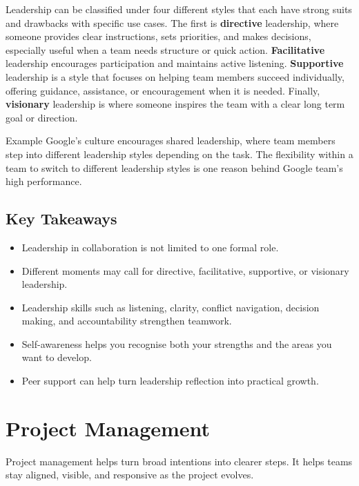 \documentclass{report}
\begin{document}
		Leadership can be classified under four different styles that each have strong suits and drawbacks with specific use cases. The first is \textbf{directive} leadership, where someone provides clear instructions, sets priorities, and makes decisions, especially useful when a team needs structure or quick action. \textbf{Facilitative} leadership encourages participation and maintains active listening. \textbf{Supportive} leadership is a style that focuses on helping team members succeed individually, offering guidance, assistance, or encouragement when it is needed. Finally, \textbf{visionary} leadership is where someone inspires the team with a clear long term goal or direction.

		\begin{question}{Example}
			Google's culture encourages shared leadership, where team members step into different leadership styles depending on the task. The flexibility within a team to switch to different leadership styles is one reason behind Google team's high performance.
		\end{question}

		\subsection{Key Takeaways}

			\begin{itemize}
				\item Leadership in collaboration is not limited to one formal role.
				\item Different moments may call for directive, facilitative, supportive, or visionary leadership.
				\item Leadership skills such as listening, clarity, conflict navigation, decision making, and accountability strengthen teamwork.
				\item Self-awareness helps you recognise both your strengths and the areas you want to develop.
				\item Peer support can help turn leadership reflection into practical growth.
			\end{itemize}

	\section{Project Management}

		Project management helps turn broad intentions into clearer steps. It helps teams stay aligned, visible, and responsive as the project evolves.
\end{document}
